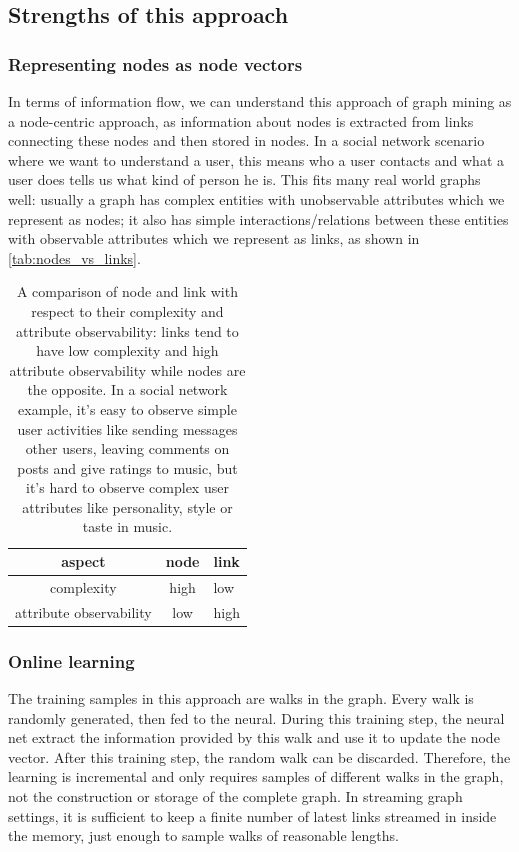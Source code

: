 \documentclass{article}
\begin{document}
\subsection{Strengths of this approach}

\subsubsection{Representing nodes as node vectors}
In terms of information flow, we can understand this approach of graph mining as a node-centric approach, as information about nodes is extracted from links connecting these nodes and then stored in nodes. In a social network scenario where we want to understand a user, this means who a user contacts and what a user does tells us what kind of person he is. This fits many real world graphs well: usually a graph has complex entities with unobservable attributes which we represent as nodes; it also has simple interactions/relations between these entities with observable attributes which we represent as links, as shown in \autoref{tab:nodes_vs_links}.

\begin{table}[h]
	\centering
	\begin{tabularx}{0.5\textwidth}{ |c|c|X| } \hline
		aspect  & node & link \\ \hline
		complexity & high & low \\ \hline
		attribute observability & low & high \\ \hline
	\end{tabularx}
	\caption{A comparison of node and link with respect to their complexity and attribute observability: links tend to have low complexity and high attribute observability while nodes are the opposite. In a social network example, it's easy to observe simple user activities like sending messages other users, leaving comments on posts and give ratings to music, but it's hard to observe complex user attributes like personality, style or taste in music.}
	\label{tab:nodes_vs_links}
\end{table}

\subsubsection{Online learning}
The training samples in this approach are walks in the graph. Every walk is randomly generated, then fed to the neural. During this training step, the neural net extract the information provided by this walk and use it to update the node vector. After this training step,  the random walk can be discarded. Therefore, the learning is incremental and only requires samples of different walks in the graph, not the construction or storage of the complete graph. In streaming graph settings, it is sufficient to keep a finite number of latest links streamed in inside the memory, just enough to sample walks of reasonable lengths.
\end{document}
